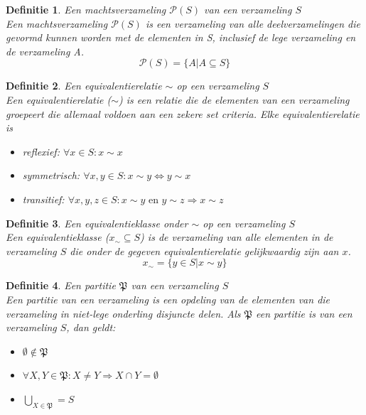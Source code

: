 \documentclass[a4paper]{article}
\newtheorem{tdefinitie}{Definitie}[section]
\newenvironment{definitie}[1]%
  {\begin{mdframed}[backgroundcolor=silver,
    topline=false,
    rightline=false,
    leftline=false,
    bottomline=false]\begin{tdefinitie}#1\\\normalfont}%
  {\end{tdefinitie}\end{mdframed}}
\newcommand{\powerset}{\ensuremath{\mathcal{P}}}
\newcommand{\partition}{\ensuremath{\mathfrak{P}}}
\newcommand{\en}{\ensuremath{\text{ en }}}
\begin{document}
\begin{definitie}{Een machtsverzameling $\powerset(S)$ van een verzameling $S$}
  Een machtsverzameling $\powerset(S)$ is een verzameling van alle deelverzamelingen die gevormd kunnen worden met de elementen in S, inclusief de lege verzameling en de verzameling A.
  \begin{equation*}
  \powerset(S) = \{A|A \subseteq S\}
  \end{equation*}
\end{definitie}

\begin{definitie}{Een equivalentierelatie $\sim$ op een verzameling $S$}
  Een equivalentierelatie ($\sim$) is een relatie die de elementen van een verzameling groepeert die allemaal voldoen aan een zekere set criteria. Elke equivalentierelatie is
  \begin{itemize}
  \item reflexief: $\forall x \in S: x \sim x$
  \item symmetrisch: $\forall x, y \in S: x \sim y \Leftrightarrow y \sim x$
  \item transitief: $\forall x, y, z \in S: x \sim y \en y \sim z \Rightarrow x \sim z$
  \end{itemize}
\end{definitie}

\begin{definitie}{Een equivalentieklasse onder $\sim$ op een verzameling $S$}
  Een equivalentieklasse ($x_\sim \subseteq S$) is de verzameling van alle elementen in de verzameling $S$ die onder de gegeven equivalentierelatie gelijkwaardig zijn aan $x$.
  \begin{equation*}
  x_\sim = \{y \in S|x \sim y\}
  \end{equation*}
\end{definitie}

\begin{definitie}{Een partitie $\partition$ van een verzameling $S$}
  Een partitie van een verzameling is een opdeling van de elementen van die verzameling in niet-lege onderling disjuncte delen. Als $\partition$ een partitie is van een verzameling $S$, dan geldt:
  \begin{itemize}
  \item $\emptyset \notin \partition$
  \item $\forall X, Y \in \partition: X \neq Y \Rightarrow X \cap Y = \emptyset$
  \item $\bigcup_{X \in \partition} = S$
  \end{itemize}
\end{definitie}
\end{document}
